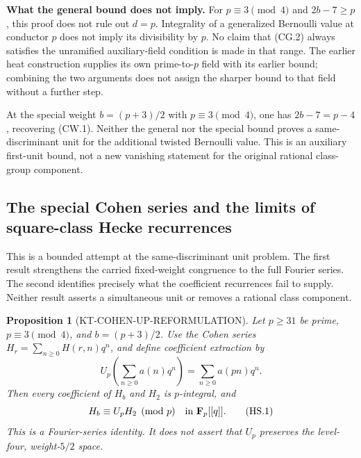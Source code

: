 \documentclass[11pt,a4paper]{article}
\newtheorem{proposition}[theorem]{Proposition}
\theoremstyle{definition}
\renewcommand{\paragraph}[1]{\par\smallskip\noindent\textbf{#1}\quad\ignorespaces}
\begin{document}
\paragraph{What the general bound does not imply.}
For $p\equiv3\pmod4$ and $2b-7\geq p$, this proof
does not rule out $d=p$.  Integrality of a generalized
Bernoulli value at conductor $p$ does not imply its
divisibility by $p$.  No claim that (CG.2) always satisfies
the unramified auxiliary-field condition is made in that
range.  The earlier heat construction supplies its own
prime-to-$p$ field with its earlier bound; combining the
two arguments does not assign the sharper bound to that
field without a further step.

At the special weight $b=(p+3)/2$ with $p\equiv3\pmod4$,
one has $2b-7=p-4$, recovering (CW.1).
Neither the general nor the special bound proves a
same-discriminant unit for the additional twisted
Bernoulli value.  This is an auxiliary first-unit bound,
not a new vanishing statement for the original rational
class-group component.



\subsection{The special Cohen series and the limits of square-class Hecke recurrences}

This is a bounded attempt at the same-discriminant unit problem.
The first result strengthens the carried fixed-weight congruence to
the full Fourier series.  The second identifies precisely what the
coefficient recurrences fail to supply.  Neither result asserts a
simultaneous unit or removes a rational class component.

\begin{proposition}[KT-COHEN-UP-REFORMULATION]
Let $p\geq31$ be prime, $p\equiv3\pmod4$, and $b=(p+3)/2$.
Use the Cohen series
$H_r=\sum_{n\geq0}H(r,n)q^n$, and define coefficient extraction by
\[
 U_p\!\left(\sum_{n\geq0}a(n)q^n\right)
                  =\sum_{n\geq0}a(pn)q^n.
\]
Then every coefficient of $H_b$ and $H_2$ is $p$-integral, and
\[
                           H_b\equiv U_p H_2\pmod p
                  \quad\hbox{in }\mathbf F_p[[q]].       \tag{HS.1}
\]
This is a Fourier-series identity.  It does not assert that $U_p$
preserves the level-four, weight-$5/2$ space.
\end{proposition}
\end{document}
